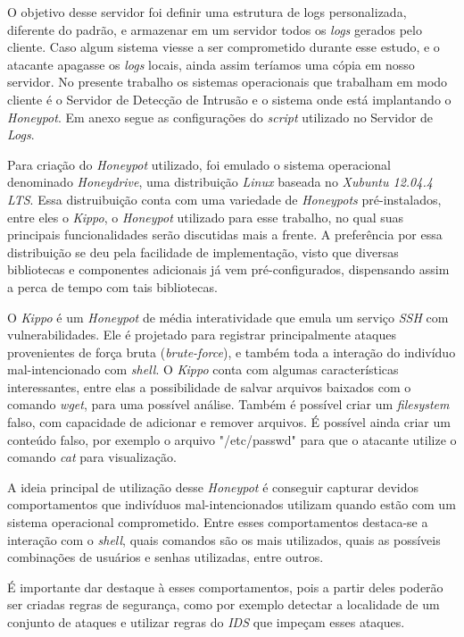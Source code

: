 O objetivo desse servidor foi definir uma estrutura de logs personalizada, diferente do padrão, e armazenar em um servidor todos os \textit{logs} gerados pelo cliente. Caso algum sistema viesse a ser comprometido durante esse estudo, e o atacante apagasse os \textit{logs} locais, ainda assim teríamos uma cópia em nosso servidor. No presente trabalho os sistemas operacionais que trabalham em modo cliente é o Servidor de Detecção de Intrusão e o sistema onde está implantando o \textit{Honeypot}. Em anexo segue as configurações do \textit{script} utilizado no Servidor de \textit{Logs}.

Para criação do \textit{Honeypot} utilizado, foi emulado o sistema operacional denominado \textit{Honeydrive}, uma distribuição \textit{Linux} baseada no \textit{Xubuntu 12.04.4 LTS}. Essa distruibuição conta com uma variedade de \textit{Honeypots} pré-instalados, entre eles o \textit{Kippo}, o \textit{Honeypot} utilizado para esse trabalho, no qual suas principais funcionalidades serão discutidas mais a frente. A preferência por essa distribuição se deu pela facilidade de implementação, visto que diversas bibliotecas e componentes adicionais já vem pré-configurados, dispensando assim a perca de tempo com tais bibliotecas.

O \textit{Kippo} é um \textit{Honeypot} de média interatividade que emula um serviço \textit{SSH} com vulnerabilidades. Ele é projetado para registrar principalmente ataques provenientes de força bruta (\textit{brute-force}), e também toda a interação do indivíduo mal-intencionado com \textit{shell}. O \textit{Kippo} conta com algumas características interessantes, entre elas a possibilidade de salvar arquivos baixados com o comando \textit{wget}, para uma possível análise. Também é possível criar um \textit{filesystem} falso, com capacidade de adicionar e remover arquivos. É possível ainda criar um conteúdo falso, por exemplo o arquivo "/etc/passwd" para que o atacante utilize o comando \textit{cat} para visualização. 

A ideia principal de utilização desse \textit{Honeypot} é conseguir capturar devidos comportamentos que indivíduos mal-intencionados utilizam quando estão com um sistema operacional comprometido. Entre esses comportamentos destaca-se a interação com o \textit{shell}, quais comandos são os mais utilizados, quais as possíveis combinações de usuários e senhas utilizadas, entre outros.

É importante dar destaque à esses comportamentos, pois a partir deles poderão ser criadas regras de segurança, como por exemplo detectar a localidade de um conjunto de ataques e utilizar regras do \textit{IDS} que impeçam esses ataques. 

